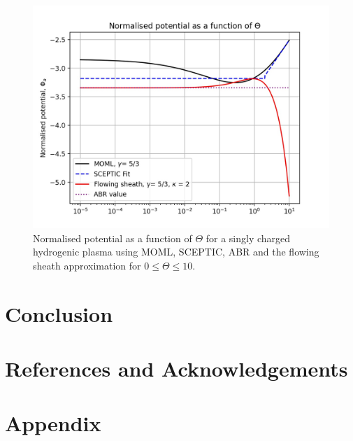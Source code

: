 \documentclass{article}
\begin{document}
\begin{figure}[H]
\centering
\includegraphics[width=\linewidth]{Output/ModelComparions.jpeg}
\caption{Normalised potential as a function of $\Theta$ for a singly charged hydrogenic plasma using MOML, SCEPTIC,
ABR and the flowing sheath approximation for $0 \leq \Theta \leq 10$.}
\label{ModelComparions} 
\end{figure}

\section{Conclusion}


\section{References and Acknowledgements}



\section{Appendix}
\end{document}
